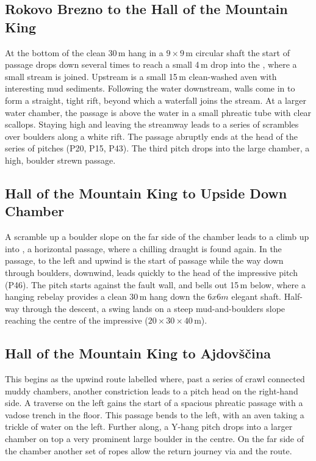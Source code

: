 \subsection{Rokovo Brezno to the Hall of the Mountain King}
 At the bottom of the clean 30\,m hang in a $9\times9$\,m circular shaft the start of  passage drops down several times to reach a small 4\,m drop into the , where a small stream is joined. Upstream is a small 15\,m clean-washed aven with interesting mud sediments. Following the water downstream, walls come in to form a straight, tight rift, beyond which a waterfall joins the stream. At a larger water chamber, the passage is above the water in a small phreatic tube with clear scallops. Staying high and leaving the streamway leads to a series of scrambles over boulders along a white rift. The passage abruptly ends at the head of the  series of pitches (P20, P15, P43). The third pitch drops into the large  chamber, a high, boulder strewn passage.

\subsection{Hall of the Mountain King to Upside Down Chamber}
A scramble up a boulder slope on the far side of the chamber leads to a climb up into , a horizontal passage, where a chilling draught is found again. In the passage, to the left and upwind is the start of  passage while the way down through boulders, downwind, leads quickly to the head of the impressive  pitch (P46). The pitch starts against the fault wall, and bells out 15\,m below, where a hanging rebelay provides a clean 30\,m hang down the $6x6m$ elegant shaft. Half-way through the descent, a swing lands on a steep mud-and-boulders slope reaching the centre of the impressive  ($20\times30\times40$\,m).

\subsection{Hall of the Mountain King to Ajdov\v{s}\v{c}ina}
This begins as the upwind route labelled  where, past a series of crawl connected muddy chambers, another constriction leads to a pitch head on the right-hand side. A traverse on the left gains the start of  a spacious phreatic passage with a vadose trench in the floor. This passage bends to the left, with an aven taking a trickle of water on the left. Further along, a Y-hang pitch drops into a larger chamber on top a very prominent large boulder in the centre. On the far side of the chamber another set of ropes allow the return journey via  and the  route.

